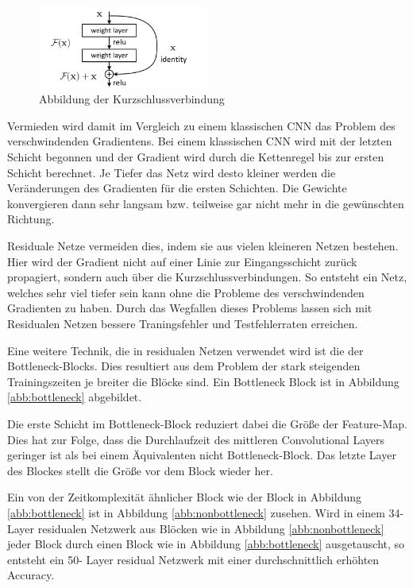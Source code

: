 \begin{figure}[h]
 \centering
 \includegraphics[width=0.5\textwidth]{KapitelPartA/images/kurzschluss.png}
 \caption{Abbildung der Kurzschlussverbindung \cite{resnet}}
 \label{abb:residual}
\end{figure}



Vermieden wird damit im Vergleich zu einem klassischen CNN das Problem des verschwindenden Gradientens. Bei einem klassischen CNN wird mit der letzten Schicht begonnen und der Gradient wird durch die Kettenregel bis zur ersten Schicht berechnet. Je Tiefer das Netz wird desto kleiner werden die Veränderungen des Gradienten für die ersten Schichten. Die Gewichte konvergieren dann sehr langsam bzw. teilweise gar nicht mehr in die gewünschten Richtung.


Residuale Netze vermeiden dies, indem sie aus vielen kleineren Netzen bestehen. Hier wird der Gradient nicht auf einer Linie zur Eingangsschicht zurück propagiert, sondern auch über die Kurzschlussverbindungen. So entsteht ein Netz, welches sehr viel tiefer sein kann ohne die Probleme des verschwindenden Gradienten zu haben. Durch das Wegfallen dieses Problems lassen sich mit Residualen Netzen bessere Traningsfehler und Testfehlerraten erreichen.

Eine weitere Technik, die in residualen Netzen verwendet wird ist die der Bottleneck-Blocks. Dies resultiert aus dem Problem der stark steigenden Trainingszeiten je breiter die Blöcke sind. Ein Bottleneck Block ist in Abbildung \ref{abb:bottleneck} abgebildet.

Die erste Schicht im Bottleneck-Block reduziert dabei die Größe der Feature-Map. Dies hat zur Folge, dass die Durchlaufzeit des mittleren Convolutional Layers geringer ist als bei einem Äquivalenten nicht Bottleneck-Block. Das letzte Layer des Blockes stellt die Größe vor dem Block wieder her.

Ein von der Zeitkomplexität ähnlicher Block wie der Block in Abbildung \ref{abb:bottleneck} ist in Abbildung \ref{abb:nonbottleneck} zusehen. Wird in einem 34-Layer residualen Netzwerk aus Blöcken wie in Abbildung \ref{abb:nonbottleneck} jeder Block durch einen Block wie in Abbildung \ref{abb:bottleneck} ausgetauscht, so entsteht ein 50- Layer residual Netzwerk mit einer durchschnittlich erhöhten Accuracy. 


